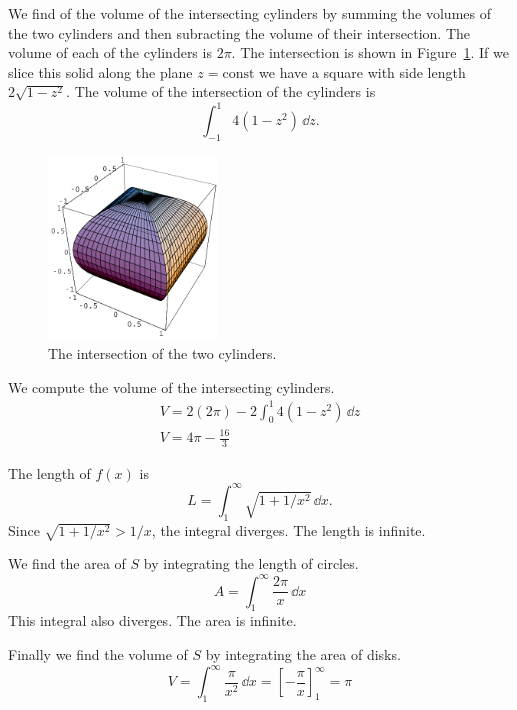 \begin{Solution}
  \label{solution cylinder intersect}
  We find of the volume of the intersecting cylinders by summing the volumes
  of the two cylinders and then subracting the volume of their intersection.
  The volume of each of the cylinders is $2 \pi$.  The intersection is shown
  in Figure~\ref{figure intersection cylinders}.  If we slice this solid
  along the plane $z = \mathrm{const}$ we have a square with side length
  $2 \sqrt{1 - z^2}$.  The volume of the intersection of the cylinders is 
  \[
  \int_{-1}^1 4 \left( 1 - z^2 \right) \,\dd z.
  \]
  \begin{figure}[h!]
    \begin{center}
      \includegraphics[width=0.4\textwidth]{calculus/vector/cylinderintersection}
    \end{center}
    \caption{The intersection of the two cylinders.}
    \label{figure intersection cylinders}
  \end{figure}
  We compute the volume of the intersecting cylinders.
  \begin{gather*}
    V = 2 (2 \pi) - 2 \int_0^1 4 \left( 1 - z^2 \right) \,\dd z
    \\
    \boxed{
      V = 4 \pi - \frac{16}{3}
      }
  \end{gather*}
\end{Solution}





\begin{Solution}
  \label{solution length area volume 1/x}
  The length of $f(x)$ is 
  \[
  L = \int_1^\infty \sqrt{1 + 1/x^2} \,\dd x.
  \]
  Since $\sqrt{1 + 1/x^2} > 1/x$, the integral diverges.  The length is 
  infinite.

  We find the area of $S$ by integrating the length of circles.
  \[
  A = \int_1^\infty \frac{2 \pi}{x} \,\dd x
  \]
  This integral also diverges.  The area is infinite.

  Finally we find the volume of $S$ by integrating the area of disks.
  \[
  V = \int_1^\infty \frac{\pi}{x^2} \,\dd x = \left[ - \frac{\pi}{x} \right]_1^\infty = \pi
  \]
\end{Solution}





